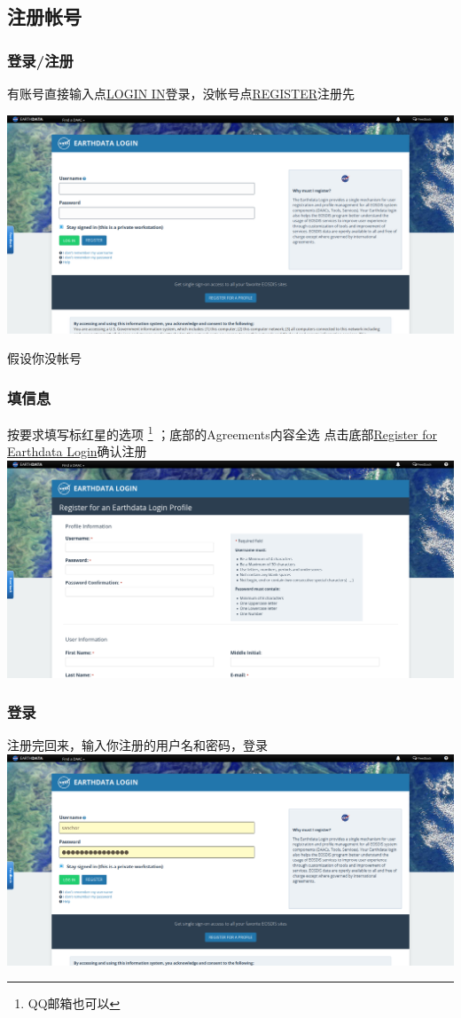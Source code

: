 \subsection{注册帐号}
\begin{frame}
    \frametitle{登录/注册}
    有账号直接输入点\uline{LOGIN IN}登录，没帐号点\uline{REGISTER}注册先

    \includegraphics[width=\linewidth]{images/4.登陆界面.png}

    假设你没帐号
\end{frame}
\begin{frame}
    \frametitle{填信息}
    按要求填写标红星的选项
    \footnote{QQ邮箱也可以}
    ；底部的Agreements内容全选
    点击底部\uline{Register for Earthdata Login}确认注册
\includegraphics[width=\linewidth]{images/5.注册帐号.png}
\end{frame}
\begin{frame}
    \frametitle{登录}
    注册完回来，输入你注册的用户名和密码，登录
    \includegraphics[width=\linewidth]{images/7.登录.png}
\end{frame}
